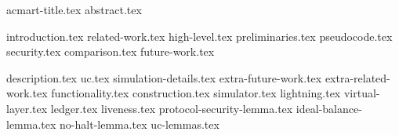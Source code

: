 \documentclass[sigconf]{acmart}
\begin{document}
\pagestyle{plain}
{acmart-title.tex}
{abstract.tex}
\maketitle


{introduction.tex}
{related-work.tex}
{high-level.tex}
{preliminaries.tex}
{pseudocode.tex}
{security.tex}
{comparison.tex}
{future-work.tex}

\newpage
\makeatletter%
%
  {\appendices}%
  {\appendix}%
\makeatother%
{description.tex}
{uc.tex}
{simulation-details.tex}
{extra-future-work.tex}
{extra-related-work.tex}
{functionality.tex}
{construction.tex}
{simulator.tex}
{lightning.tex}
{virtual-layer.tex}
{ledger.tex}
{liveness.tex}
{protocol-security-lemma.tex}
{ideal-balance-lemma.tex}
{no-halt-lemma.tex}
{uc-lemmas.tex}
\end{document}
